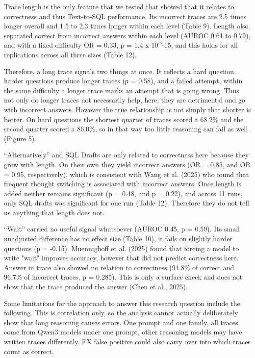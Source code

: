 Trace length is the only feature that we tested that showed that it relates to correctness and thus Text-to-SQL performance. Its incorrect traces are 2.5 times longer overall and 1.5 to 2.3 times longer within each level (Table 9). Length also separated correct from incorrect answers within each level (AUROC 0.61 to 0.79), and with a fixed difficulty OR = 0.33, p = 1.4 x 10\^{}-15, and this holds for all replications across all three sizes (Table 12).

Therefore, a long trace signals two things at once. It reflects a hard question, harder questions produce longer traces (ρ = 0.58), and a failed attempt, within the same difficulty a longer trace marks an attempt that is going wrong. Thus not only do longer traces not necessarily help, here, they are detrimental and go with incorrect answers. However the true relationship is not simply that shorter is better. On hard questions the shortest quarter of traces scored a 68.2\% and the second quarter scored a 86.0\%, so in that way too little reasoning can fail as well (Figure 5).

``Alternatively'' and SQL Drafts are only related to correctness here because they grow with length. On their own they yield incorrect answers (OR = 0.85, and OR = 0.95, respectively), which is consistent with Wang et al. (2025) who found that frequent thought switching is associated with incorrect answers. Once length is added neither remains significant (p = 0.48, and p = 0.22), and across 11 runs, only SQL drafts was significant for one run (Table 12). Therefore they do not tell us anything that length does not.

``Wait'' carried no useful signal whatsoever (AUROC 0.45, p = 0.59). Its small unadjusted difference has no effect size (Table 10), it fails on slightly harder questions (ρ = -0.15). Muennighoff et al. (2025) found that forcing a model to write "wait" improves accuracy, however that did not predict correctness here. Answer in trace also showed no relation to correctness (94.8\% of correct and 96.7\% of incorrect traces, p = 0.285). This is only a surface check and does not show that the trace produced the answer (Chen et al., 2025).

Some limitations for the approach to answer this research question include the following. This is correlation only, so the analysis cannot actually deliberately show that long reasoning causes errors. One prompt and one family, all traces come from Qwen3 models under one prompt, other reasoning models may have written traces differently. EX false positive could also carry over into which traces count as correct.

